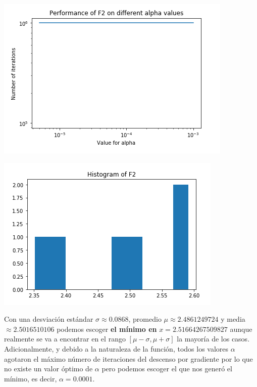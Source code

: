 \documentclass[10pt,letterpaper]{article}
\begin{document}
\begin{enumerate}
\begin{enumerate}
                    \begin{multicols}{2}
                        \begin{center}
                            \includegraphics[scale=.45]{assets/theory/1-a/f2-performance.png}
                        \end{center}
                        \begin{center}
                            \includegraphics[scale=.45]{assets/theory/1-a/f2-dist.png}
                        \end{center}
                    \end{multicols}

                    Con una desviación estándar $\sigma \approx 0.0868$,
                    promedio $\mu \approx 2.4861249724$ y media $\approx 2.5016510106$
                    podemos escoger \textbf{el mínimo en} $x=2.51664267509827$ aunque realmente
                    se va a encontrar en el rango $[\mu - \sigma, \mu + \sigma]$ la
                    mayoría de los casos.
                    Adicionalmente, y debido a la naturaleza de la función, todos
                    los valores $\alpha$ agotaron el máximo número de iteraciones
                    del descenso por gradiente por lo que no existe un valor óptimo
                    de $\alpha$ pero podemos escoger el que nos generó el mínimo, es
                    decir, $\alpha = 0.0001$.


\end{enumerate}
\end{enumerate}
\end{document}
